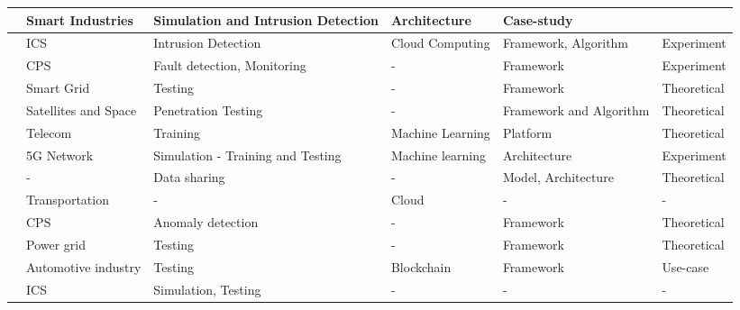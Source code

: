 \begin{table}[H]
\begin{NiceTabular}{p{0.5cm}|p{2cm}|p{2.5cm}|p{2cm}|p{3cm}|p{1.5cm}}
    \cite{hussainiTaxonomySecurityDefense2022} & Smart Industries & Simulation and Intrusion Detection & Architecture & Case-study \\
    \hline

    \cite{akbarianSecurityFrameworkDigital2021} & ICS & Intrusion Detection & Cloud Computing & Framework, Algorithm & Experiment \\
    \hline

    \cite{xuGametheoreticApproachSecure2020} & CPS & Fault detection, Monitoring & - & Framework & Experiment \\
    \hline

    \cite{atalayDigitalTwinsApproach2020} & Smart Grid & Testing & - & Framework & Theoretical \\
    \hline

    \cite{houDigitalTwinRuntime2022} & Satellites and Space & Penetration Testing & - & Framework and Algorithm & Theoretical \\
    \hline

    \cite{vakarukDigitalTwinNetwork2021} & Telecom & Training & Machine Learning & Platform & Theoretical \\
    \hline

    \cite{rebecchiDigitalTwin5G2022} & 5G Network & Simulation - Training and Testing & Machine learning & Architecture & Experiment \\
    \hline

    \cite{gehrmannDigitalTwinBased2020} & - &  Data sharing & - & Model, Architecture & Theoretical \\
    \hline

    \cite{chengzhelaiSPDTSecurePrivacyPreserving2022} & Transportation & - & Cloud & - & - \\
    \hline

    \cite{alessandradebenedictischristiancarmineespositoalessandrasommaAdoptionSecureCyber2022} & CPS & Anomaly detection & - & Framework & Theoretical \\
    \hline

    \cite{olivares-rojasCybersecuritySmartGrid2022} & Power grid & Testing & - & Framework & Theoretical \\
    \hline

    \cite{suhailSituationalAwareCyberphysical2022} & Automotive industry & Testing & Blockchain & Framework & Use-case \\
    \hline

    \cite{dietzHarnessingDigitalTwin2022} &  ICS & Simulation, Testing & - & - & - \\
    \hline
\bottomrule
\end{NiceTabular}
\end{table}








